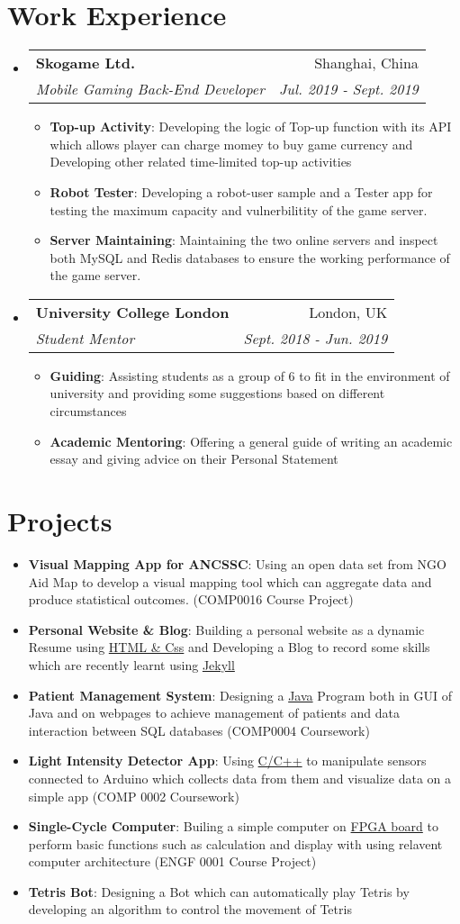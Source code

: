 \documentclass[letterpaper,11pt]{article}
\makeatletter
\newcommand{\resumeItem}[2]{
  \item\small{
    \textbf{#1}{: #2 \vspace{-2pt}}
  }
}
\newcommand{\resumeSubheading}[4]{
  \vspace{-1pt}\item
    \begin{tabular*}{0.97\textwidth}[t]{l@{\extracolsep{\fill}}r}
      \textbf{#1} & #2 \\
      \textit{\small#3} & \textit{\small #4} \\
    \end{tabular*}\vspace{-5pt}
}
\newcommand{\resumeSubItem}[2]{\resumeItem{#1}{#2}\vspace{-4pt}}
\newcommand{\resumeSubHeadingListStart}{\begin{itemize}[leftmargin=*]}
\newcommand{\resumeSubHeadingListEnd}{\end{itemize}}
\newcommand{\resumeItemListStart}{\begin{itemize}}
\newcommand{\resumeItemListEnd}{\end{itemize}\vspace{-5pt}}
\makeatother
\begin{document}
\section{Work Experience}
  \resumeSubHeadingListStart
    \resumeSubheading
      {Skogame Ltd.}{Shanghai, China}
      {Mobile Gaming Back-End Developer}{Jul. 2019 - Sept. 2019}
      \resumeItemListStart
        \resumeItem{Top-up Activity}
            {Developing the logic of Top-up function with its API which allows player can charge momey to buy game currency
            and Developing other related time-limited top-up activities}
        \resumeItem{Robot Tester}
            {Developing a robot-user sample and a Tester app for testing the maximum capacity
            and vulnerbilitity of the game server.}
        \resumeItem{Server Maintaining}
            {Maintaining the two online servers and inspect both MySQL and Redis databases to ensure the working
            performance of the game server.}
        
      \resumeItemListEnd

    \resumeSubheading
      {University College London}{London, UK}
      {Student Mentor}{Sept. 2018 - Jun. 2019}
      \resumeItemListStart
        \resumeItem{Guiding}
          {Assisting students as a group of 6 to fit in the environment of university and providing some suggestions based on different circumstances}
        \resumeItem{Academic Mentoring}
          {Offering a general guide of writing an academic essay and giving advice on their Personal Statement}
      \resumeItemListEnd


  \resumeSubHeadingListEnd


\section{Projects}
  \resumeSubHeadingListStart
    \resumeSubItem{Visual Mapping App for ANCSSC}
      {Using an open data set from NGO Aid Map to develop a visual mapping tool which can 
      aggregate data and produce statistical outcomes. (COMP0016 Course Project)}
    \resumeSubItem{Personal Website \& Blog}
        {Building a personal website as a dynamic Resume using \underline{HTML \& Css} and Developing a Blog
        to record some skills which are recently learnt using \underline{Jekyll}}
    \resumeSubItem{Patient Management System}
      {Designing a \underline{Java} Program both in GUI of Java and on webpages to achieve management of
      patients and data interaction between SQL databases (COMP0004 Coursework)}
    \resumeSubItem{Light Intensity Detector App}
      {Using \underline{C/C++} to manipulate sensors connected to Arduino which collects data from them 
      and visualize data on a simple app (COMP 0002 Coursework)}
    \resumeSubItem{Single-Cycle Computer}
      {Builing a simple computer on \underline{FPGA board} to perform basic functions such as calculation and display
      with using relavent computer architecture (ENGF 0001 Course Project)}
    \resumeSubItem{Tetris Bot}
        {Designing a Bot which can automatically play Tetris by developing an algorithm to control the movement of Tetris}
  \resumeSubHeadingListEnd



\end{document}

